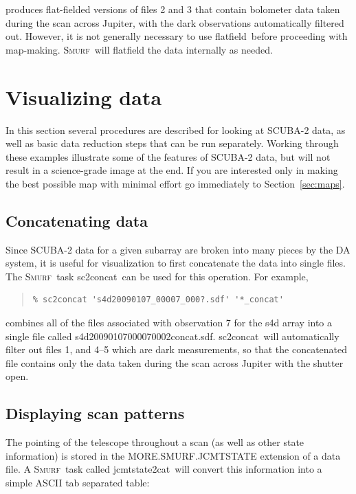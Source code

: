 \documentclass[twoside,11pt]{article}
\newenvironment{myquote}{\begin{quote}\begin{small}}{\end{small}\end{quote}}
\newcommand{\smurf}{\xref{\textsc{Smurf}}{sun258}{}}
\newcommand{\task}[1]{\textsf{#1}}
\newcommand{\concat}{\xref{\task{sc2concat}}{sun258}{SC2CONCAT}}
\newcommand{\flatfield}{\xref{\task{flatfield}}{sun258}{FLATFIELD}}
\newcommand{\jcmtstate}{\xref{\task{jcmtstate2cat}}{sun258}{JCMTSTATE2CAT}}
\newcommand{\xref}[3]{#1}
\newcommand{\xlabel}[1]{}
\renewcommand{\_}{\texttt{\symbol{95}}}
\begin{document}
produces flat-fielded versions of files 2 and 3 that contain bolometer
data taken during the scan across Jupiter, with the dark observations
automatically filtered out. However, it is not generally necessary to
use \flatfield\ before proceeding with map-making. \smurf\ will
flatfield the data internally as needed.

\section{\xlabel{time_series}Visualizing data}
\label{sec:visual}

In this section several procedures are described for looking at
SCUBA-2 data, as well as basic data reduction steps that can be run
separately. Working through these examples illustrate some of the
features of SCUBA-2 data, but will not result in a science-grade image
at the end. If you are interested only in making the best possible map
with minimal effort go immediately to Section~\ref{sec:maps}.

\subsection{\xlabel{concat}Concatenating data} 

Since SCUBA-2 data for a given subarray are broken into many pieces by
the DA system, it is useful for visualization to first concatenate the
data into single files. The \smurf\ task \concat\ can be used for this
operation. For example,

\begin{myquote}
\begin{verbatim}
% sc2concat 's4d20090107_00007_000?.sdf' '*_concat' 
\end{verbatim}
\end{myquote}

combines all of the files associated with observation 7 for the s4d
array into a single file called
s4d20090107\_00007\_0002\_concat.sdf. \concat\ will automatically
filter out files 1, and 4--5 which are dark measurements, so that the
concatenated file contains only the data taken during the scan across
Jupiter with the shutter open.

\subsection{\xlabel{display_scan}Displaying scan patterns}

The pointing of the telescope throughout a scan (as well as other
state information) is stored in the MORE.SMURF.JCMTSTATE extension of
a data file. A \smurf\ task called \jcmtstate\ will convert this
information into a simple ASCII tab separated table:
\end{document}
